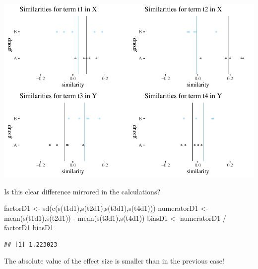 \documentclass[
  10pt,
  dvipsnames,enabledeprecatedfontcommands]{scrartcl}
\newenvironment{Shaded}{\begin{snugshade}}{\end{snugshade}}
\newcommand{\FunctionTok}[1]{\textcolor[rgb]{0.00,0.00,0.00}{#1}}
\newcommand{\NormalTok}[1]{#1}
\newcommand{\OtherTok}[1]{\textcolor[rgb]{0.56,0.35,0.01}{#1}}
\newcommand{\SpecialCharTok}[1]{\textcolor[rgb]{0.00,0.00,0.00}{#1}}
\begin{document}
\normalsize

\vspace{1mm}
\footnotesize

\begin{center}\includegraphics[width=1\linewidth]{paperDraft_files/figure-latex/unnamed-chunk-14-1} \end{center}
\normalsize

\noindent  Is this clear difference mirrored in the calculations?

\footnotesize

\begin{Shaded}
\begin{Highlighting}[]
\NormalTok{factorD1 }\OtherTok{\textless{}{-}} \FunctionTok{sd}\NormalTok{(}\FunctionTok{c}\NormalTok{(}\FunctionTok{s}\NormalTok{(t1d1),}\FunctionTok{s}\NormalTok{(t2d1),}\FunctionTok{s}\NormalTok{(t3d1),}\FunctionTok{s}\NormalTok{(t4d1)))}
\NormalTok{numeratorD1 }\OtherTok{\textless{}{-}}  \FunctionTok{mean}\NormalTok{(}\FunctionTok{s}\NormalTok{(t1d1),}\FunctionTok{s}\NormalTok{(t2d1)) }\SpecialCharTok{{-}} \FunctionTok{mean}\NormalTok{(}\FunctionTok{s}\NormalTok{(t3d1),}\FunctionTok{s}\NormalTok{(t4d1))}
\NormalTok{biasD1 }\OtherTok{\textless{}{-}}\NormalTok{ numeratorD1 }\SpecialCharTok{/}\NormalTok{ factorD1}
\NormalTok{biasD1}
\end{Highlighting}
\end{Shaded}

\begin{verbatim}
## [1] 1.223023
\end{verbatim}

\normalsize

\noindent The absolute value of the effect size is smaller than in the
previous case!
\end{document}
